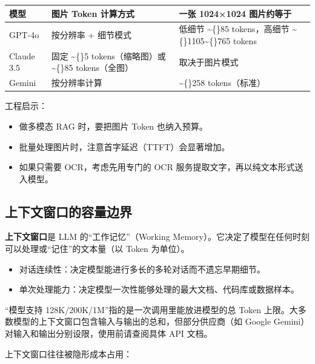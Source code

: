 \documentclass[9pt,a4paper,twocolumn]{ctexart}
\begin{document}
{\footnotesize
\begin{tabular}{|p{}|p{}|p{}|}
\hline
\textbf{模型} & \textbf{图片 Token 计算方式} & \textbf{一张 1024×1024 图片约等于} \\
\hline
GPT-4o & 按分辨率 + 细节模式 & 低细节 \textasciitilde\{\}85 tokens，高细节 \textasciitilde\{\}1105\textasciitilde\{\}765 tokens \\
\hline
Claude 3.5 & 固定 \textasciitilde\{\}5 tokens（缩略图）或 \textasciitilde\{\}85 tokens（全图） & 取决于图片模式 \\
\hline
Gemini & 按分辨率计算 & \textasciitilde\{\}258 tokens（标准） \\
\hline
\end{tabular}
}



工程启示：


\begin{itemize}[itemsep=1pt, topsep=2pt]
  \item 做多模态 RAG 时，要把图片 Token 也纳入预算。
  \item 批量处理图片时，注意首字延迟（TTFT）会显著增加。
  \item 如果只需要 OCR，考虑先用专门的 OCR 服务提取文字，再以纯文本形式送入模型。
\end{itemize}


\subsection*{上下文窗口的容量边界}


\textbf{上下文窗口}是 LLM 的“工作记忆”（Working Memory）。它决定了模型在任何时刻可以处理或“记住”的文本量（以 Token 为单位）。


\begin{itemize}[itemsep=1pt, topsep=2pt]
  \item 对话连续性：决定模型能进行多长的多轮对话而不遗忘早期细节。
  \item 单次处理能力：决定模型一次性能够处理的最大文档、代码库或数据样本。
\end{itemize}


“模型支持 128K/200K/1M”指的是一次调用里能放进模型的总 Token 上限。大多数模型的上下文窗口包含输入与输出的总和，但部分供应商（如 Google Gemini）对输入和输出分别设限，使用前请查阅具体 API 文档。



上下文窗口往往被隐形成本占用：
\end{document}
